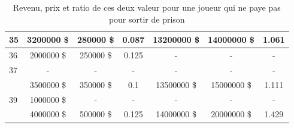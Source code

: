\documentclass[letterpaper]{article}
\begin{document}
\begin{table}[h]
\begin{tabular}{|l|c|c|c||c|c|c|}
	  \cellcolor[HTML]{2E8B57} 35 & 3200000 \$ & 280000 \$ & 0.087 & 13200000 \$ & 14000000 \$ & 1.061 \\ \hline
	  \cellcolor[HTML]{E6E6FA} 36 & 2000000 \$ & 250000 \$ & 0.125 & - & - & - \\ \hline
	  \cellcolor[HTML]{FFC1C1} 37  & - & - & - & - & - & - \\ \hline
	  \cellcolor[HTML]{483D8B} \textcolor{white}{38} & 3500000 \$ & 350000 \$ & 0.1 & 13500000 \$ & 15000000 \$ & 1.111 \\ \hline
	  \cellcolor[HTML]{8B1A1A} 39  & 1000000 \$ & - & - & - & - & - \\ \hline
	  \cellcolor[HTML]{483D8B} \textcolor{white}{40} & 4000000 \$ & 500000 \$ & 0.125 & 14000000 \$ & 20000000 \$ & 1.429 \\ \hline
	\end{tabular}
	\caption{Revenu, prix et ratio de ces deux valeur pour une joueur qui ne paye pas pour sortir de prison}
	\label{table:rentabilite_paye_pas}
      \end{table}
\end{document}

